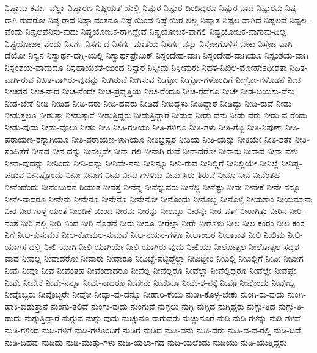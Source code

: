 {ನಿಷ್ಕಾಮ-ಕರ್ಮ-ವೆಲ್ಲಾ
ನಿಷ್ಕಾರಣ
ನಿಷ್ಕ್ರಿಯತೆ-ಯಲ್ಲಿ
ನಿಷ್ಟುರ
ನಿಷ್ಟುರ-ದಿಂದಿದ್ದರೂ
ನಿಷ್ಟುರ-ನಾದ
ನಿಷ್ಟುರನು
ನಿಷ್ಠ-ರಾಗಿ-ರುವರೋ
ನಿಷ್ಠ-ರಾದ
ನಿಷ್ಠಾ-ವಂತನೂ
ನಿಷ್ಠೆ-ಯಿಂದ
ನಿಷ್ಠೆ-ಯಿರ-ಲಿಲ್ಲ
ನಿಷ್ಣಾತ
ನಿಷ್ಪಲ-ವಾಗಿದೆ
ನಿಷ್ಪಲವೆ
ನಿಷ್ಪಲ-ವೆಂದು
ನಿಷ್ಪಲವೆನಿಸು-ವುದು
ನಿಷ್ಪ್ರಯೋಜಕ-ರಾಗಿದ್ದೇವೆ
ನಿಷ್ಪ್ರಯೋಜಕ-ವಾಗಲಿ
ನಿಷ್ಪ್ರಯೋಜಕ-ವಾಗುವು-ದಿಲ್ಲ
ನಿಷ್ಪ್ರಯೋಜಕ-ವೆಂದು
ನಿಸರ್ಗ
ನಿಸರ್ಗದ
ನಿಸರ್ಗ-ಮಾತೆಯ
ನಿಸರ್ಗ-ವನ್ನು
ನಿಸ್ತೇಜಗೊಳಿಸ-ಬೇಕು
ನಿಸ್ತೇಜ-ವಾಗಿ-ದೆಯೋ
ನಿಸ್ವನ
ನಿಸ್ವಾರ್ಥ-ದಗ್ನಿ-ಯಲ್ಲಿ
ನಿಸ್ವಾರ್ಥಪ್ರೇಮಿಕ್
ನಿಸ್ಸಂದೇಹ-ವಾಗಿ
ನಿಸ್ಸಂದೇಹ-ವಾಗಿಯೂ
ನಿಸ್ಸಂಶಯ-ವಾಗಿ
ನಿಸ್ಸಂಶಯ-ವಾದುದೂ
ನಿಸ್ಸಹಾಯಕತೆ-ಯಿಂದ
ನಿಸ್ಸಾರ
ನಿಸ್ಸೀಮ
ನಿಸ್ಸೀಮರು
ನಿಹತ-ನಿಖಿಲ-ಮೋಹೇಽಧೀಶತಾ
ನಿಹಿತ-ವಾಗಿ-ರುವ
ನಿಹಿತ-ವಾಗಿರು-ವುದನ್ನು
ನೀಗಿರುವೆ
ನೀಗಿಸುವ
ನೀಗ್ರೋ
ನೀಗ್ರೋ-ಗಳೊಂದಿಗೆ
ನೀಗ್ರೋ-ಗಳೊಡನೆ
ನೀಚ
ನೀಚತನ
ನೀಚ-ನಾದ
ನೀಚ-ನೆಂದೇ
ನೀಚ-ಪ್ರವೃತ್ತಿಯ
ನೀಚ-ರೆಂದೂ
ನೀಚ-ರೆದೆಗೂ
ನೀಚೇ
ನೀಡ-ಬಯಸು-ವೆನು
ನೀಡ-ಬೇಕೆ
ನೀಡಿ
ನೀಡಿದ
ನೀಡಿ-ದರು
ನೀಡಿ-ದವರು
ನೀಡಿದೆ
ನೀಡಿದ್ದಳು
ನೀಡಿದ್ದಾರೆ
ನೀಡಿದ್ದು
ನೀಡಿ-ರುವೆ
ನೀಡು
ನೀಡುತ್ತಲೂ
ನೀಡುತ್ತಾ
ನೀಡುತ್ತಾರೆ
ನೀಡುತ್ತಿದ್ದರು
ನೀಡುತ್ತಿದ್ದಾರೆ
ನೀಡುವ
ನೀಡು-ವನು
ನೀಡು-ವರು
ನೀಡು-ವ-ರೆಂದು
ನೀಡು-ವುದು
ನೀಡು-ವೊಲು
ನೀತಂ
ನೀತಿ
ನೀತಿ-ಗಡಿಯು
ನೀತಿ-ಗಳಿಗೂ
ನೀತಿ-ಗಳು
ನೀತಿ-ಗೆಟ್ಟ
ನೀತಿ-ನಿಪುಣಾ
ನೀತಿ-ಪರಾಯಣ-ರನ್ನಾಗಿಯೂ
ನೀತಿ-ಪರಾಯಣ-ಳಾಗಿಯೂ
ನೀತಿಭ್ರಷ್ಟರ
ನೀತಿಯ
ನೀತಿ-ಯನ್ನು
ನೀತಿಯೇ
ನೀತಿ-ಶತಕ
ನೀತಿ-ಸಂಹಿತೆಗೆ
ನೀನದ
ನೀನ-ದನ್ನು
ನೀನಲ್ಲವೇ
ನೀನಾ-ಗಲಿ
ನೀನಾಗಿ-ರುವೆ
ನೀನಾದರೋ
ನೀನಾರು
ನೀನಾವ
ನೀನಾ-ವಳು
ನೀನಾ-ವುದನ್ನು
ನೀನಿಂದು
ನೀನಿ-ದನ್ನು
ನೀನಿದೇ-ನನು
ನೀನಿನ್ನೂ
ನೀನಿ-ರುವ
ನೀನಿಲ್ಲಿಗೆ
ನೀನಿಲ್ಲಿಯೇ
ನೀನಿಲ್ಲೆ
ನೀನಿಷ್ಟ-ಪಡುವ
ನೀನಿಷ್ಟೊಂದು
ನೀನೀ
ನೀನೀಗ
ನೀನು
ನೀನು-ಗಳಳಿದು
ನೀನು-ಸಿರು-ತಿರುವೆ
ನೀನೂ
ನೀನೆ
ನೀನೆಂತಹ
ನೀನೆಂದೆಂದು
ನೀನೆಂಬುದನ-ರಿಯುತ
ನೀನೆತ್ತ
ನೀನೆನ್ನ
ನೀನೆನ್ನುವರು
ನೀನೆಲ್ಲಿ
ನೀನೆಷ್ಟು
ನೀನೇ
ನೀನೇಕೆ
ನೀನೇ-ನನ್ನೂ
ನೀನೇ-ನಾದರೂ
ನೀನೇನು
ನೀನೇನೂ
ನೀನೇನೊ
ನೀನೇನೋ
ನೀನೊಂದು
ನೀನೊಬ್ಬ
ನೀನೊಳ್ಳೆ
ನೀಯತಾಂ
ನೀಯಮಾನಾ
ನೀರ
ನೀರ-ಗುಳ್ಳೆ-ಯಂತೆ
ನೀರಡಿಕೆ-ಯಿಂದ
ನೀರನು
ನೀರನ್ನು
ನೀರನ್ನೂ
ನೀರನ್ನೇ
ನೀರ-ವತ್
ನೀರಾಗಿತ್ತು
ನೀರಿನ
ನೀರಿ-ನಂತೆ
ನೀರಿ-ನಲ್ಲಿ
ನೀರಿ-ನಿಂದ
ನೀರಿ-ನೊಡನೆ
ನೀರು
ನೀರೂ
ನೀರೆಲ್ಲಾ
ನೀರೇ
ನೀರೊಳು
ನೀಲ
ನೀಲ-ಕಂಠಂ
ನೀಲ-ಕಂಠ-ನಿಗೆ
ನೀಲ-ಕುಸುಮಕೆ
ನೀಲ-ಕೋಮಲ-ಸುಮವೆ
ನೀಲ-ನಯನ-ಗಳೊ
ನೀಲಾಂಬರ
ನೀಲಾಕಾಶ
ನೀಲಿ
ನೀಲಿಮ
ನೀಲಿ-ಯಾಗಸ-ದಲ್ಲಿ
ನೀಲಿ-ಯಾಗಿ
ನೀಲಿ-ಯಾಗಿಯೇ
ನೀಲಿ-ಯಾಗಿರು-ವುದು
ನೀಲಿಯು
ನೀಲೋತ್ಪಲ
ನೀಲೋತ್ಪಲ-ಸದೃಶ-ವಾದ
ನೀವಲ್ಲ
ನೀವಾದರೋ
ನೀವಾರು
ನೀವಾರೂ
ನೀವಿಚ್ಛೆ-ಪಟ್ಟಿದ್ದೆಲ್ಲಾ
ನೀವಿದ್ದೀರಿ
ನೀವಿಲ್ಲಿ
ನೀವಿಲ್ಲಿಗೆ
ನೀವೀ
ನೀವೀಗ
ನೀವು
ನೀವೂ
ನೀವೆ
ನೀವೆಂತಹ
ನೀವೆಂದಾದರೂ
ನೀವೆಲ್ಲ
ನೀವೆಲ್ಲರೂ
ನೀವೆಲ್ಲಾ
ನೀವೆಲ್ಲಿದ್ದರೂ
ನೀವೆಲ್ಲೇ
ನೀವೆಷ್ಟೇ
ನೀವೇ
ನೀವೇಕೆ
ನೀವೇ-ನನ್ನೂ
ನೀವೇ-ನಾದರೂ
ನೀವೇನು
ನೀವೇನೂ
ನೀವೇ-ಶ-ನಕ್ಕೆ
ನೀವೊ
ನೀವೊಂದು
ನೀವೊಬ್ಬ
ನೀವೊಬ್ಬರು
ನೀವೊಬ್ಬರೇ
ನೀವೋ
ನೀವ್ಯಾ-ವು-ದನ್ನೂ
ನೀಹಾರಿ-ಕೆಯು
ನುಂಗಿ-ಕೊಳ್ಳ-ಬೇಕು
ನುಂಗಿ-ರು-ವುದು
ನುಂಗಿ-ಹಾಕಿ-ಬಿಡುತ್ತಾನೆ
ನುಂಗು-ತಲಿದೆ
ನುಂಗು-ವುದು
ನುಂಗುವೆ
ನುಗ್ಗಲು
ನುಗ್ಗಿ
ನುಗ್ಗಿದ
ನುಗ್ಗಿದ್ದರು
ನುಗ್ಗು-ತಿದೆ
ನುಗ್ಗು-ತಿ-ಹುದು
ನುಗ್ಗುತ್ತಿದ್ದಾರೆ
ನುಗ್ಗುವ
ನುಗ್ಗು-ವುದು
ನುಚ್ಚುನೂ-ರಾಗುವರು
ನುಚ್ಚುನೂರೆ
ನುಡಿ
ನುಡಿ-ಗಳನ್ನು
ನುಡಿ-ಗಳವೆ
ನುಡಿ-ಗಳಿಂದ
ನುಡಿ-ಗಳಿಗೆ
ನುಡಿ-ಗಳೊಂದಿಗೆ
ನುಡಿಗೆ
ನುಡಿದ
ನುಡಿ-ದನು
ನುಡಿ-ದರು
ನುಡಿ-ದ-ವ-ರಲ್ಲಿ
ನುಡಿ-ದಿದೆ
ನುಡಿ-ದಿಹವು
ನುಡಿದು
ನುಡಿ-ಮುತ್ತು-ಗಳು
ನುಡಿ-ಯಲಾ-ಗದ
ನುಡಿ-ಯಲೆಂದು
ನುಡಿಯು
ನುಡಿ-ಯುತ್ತಿದ್ದರು
}

